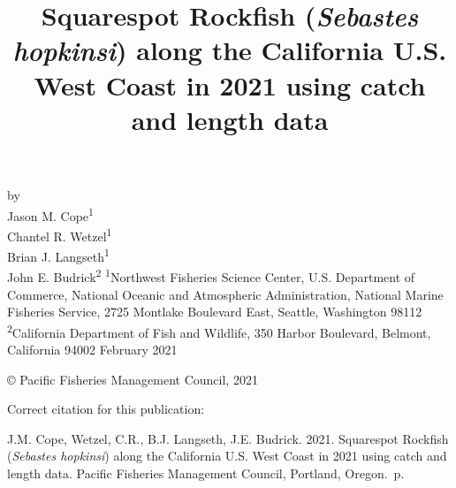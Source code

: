\documentclass[11pt,
  english,
  a4paper,
]{article}
\date{}
\newcommand{\trTitle}{Squarespot Rockfish (\emph{Sebastes hopkinsi}) along the California U.S. West Coast in 2021 using catch and length data}
\newcommand{\trYear}{2021}
\newcommand{\trMonth}{February}
\newcommand{\trAuthsBack}{J.M. Cope, Wetzel, C.R., B.J. Langseth, J.E. Budrick}
\newcommand{\trCitation}{
\begin{hangparas}{1em}{1}
\trAuthsBack{}. \trYear{}. \trTitle{}. Pacific Fisheries Management Council, Portland, Oregon. \pageref{LastPage}{}\,p.
\end{hangparas}}
\begin{document}

\renewcommand*{\thefootnote}{\fnsymbol{footnote}}

\small
\thispagestyle{empty}
\noindent
\begin{center}
\title{Squarespot Rockfish (\emph{Sebastes hopkinsi}) along the California U.S. West Coast in 2021 using catch and length data}
\vspace{1.5cm}
{\Large\textbf{}}
\vfill
by\\
Jason M. Cope\textsuperscript{1}\\
Chantel R. Wetzel\textsuperscript{1}\\
Brian J. Langseth\textsuperscript{1}\\
John E. Budrick\textsuperscript{2}\vfill
\textsuperscript{1}Northwest Fisheries Science Center, U.S. Department of Commerce, National Oceanic and Atmospheric Administration, National Marine Fisheries Service, 2725 Montlake Boulevard East, Seattle, Washington 98112\\
\textsuperscript{2}California Department of Fish and Wildlife, 350 Harbor Boulevard, Belmont, California 94002\vfill
\trMonth{} \trYear{}
\end{center}
\clearpage

\thispagestyle{empty}
\vspace*{\fill}
\begin{center}
\copyright{} Pacific Fisheries Management Council, \trYear{}\\
\end{center}
\par
\bigskip
\noindent
Correct citation for this publication:
\bigskip
\par
\trCitation{}
\clearpage


\tableofcontents\clearpage
\listoffigures \listoftables \clearpage
\label{TRlastRoman}
\clearpage

\newpage
\thispagestyle{empty} %

\pagestyle{plain}  %
\renewcommand*{\thefootnote}{\arabic{footnote}}  %
\setcounter{footnote}{0}  %
\renewcommand{\headrulewidth}{0.5pt}
\renewcommand{\footrulewidth}{0.5pt}
\end{document}
